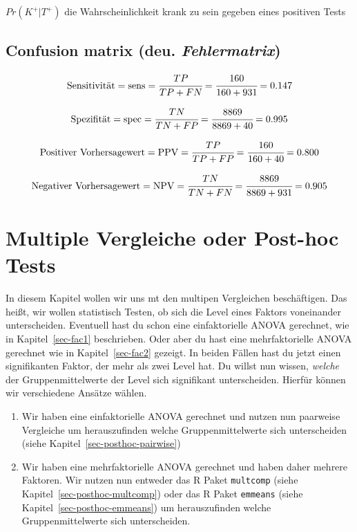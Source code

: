 \documentclass[
  letterpaper,
  DIV=11,
  oneside]{scrreport}
\providecommand{\tightlist}{%
  \setlength{\itemsep}{0pt}\setlength{\parskip}{0pt}}\usepackage{longtable,booktabs,array}
\begin{document}
\(Pr(K^+|T^+)\) die Wahrscheinlichkeit krank zu sein gegeben eines
positiven Tests

\hypertarget{confusion-matrix-deu.-fehlermatrix}{%
\section{\texorpdfstring{Confusion matrix (deu.
\emph{Fehlermatrix})}{Confusion matrix (deu. Fehlermatrix)}}\label{confusion-matrix-deu.-fehlermatrix}}


\[
\mbox{Sensitivität} = \mbox{sens} = \cfrac{TP}{TP + FN} = \cfrac{160}{160 + 931} = 0.147
\]

\[
\mbox{Spezifität} = \mbox{spec} = \cfrac{TN}{TN + FP} = \cfrac{8869}{8869 + 40} = 0.995
\]

\[
\mbox{Positiver Vorhersagewert} = \mbox{PPV} = \cfrac{TP}{TP + FP} = \cfrac{160}{160 + 40} = 0.800
\]

\[
\mbox{Negativer Vorhersagewert} = \mbox{NPV} = \cfrac{TN}{TN + FN} = \cfrac{8869}{8869 + 931} = 0.905
\]

\hypertarget{sec-posthoc}{%
\chapter{Multiple Vergleiche oder Post-hoc Tests}\label{sec-posthoc}}

In diesem Kapitel wollen wir uns mt den multipen Vergleichen
beschäftigen. Das heißt, wir wollen statistisch Testen, ob sich die
Level eines Faktors voneinander unterscheiden. Eventuell hast du schon
eine einfaktorielle ANOVA gerechnet, wie in Kapitel~\ref{sec-fac1}
beschrieben. Oder aber du hast eine mehrfaktorielle ANOVA gerechnet wie
in Kapitel~\ref{sec-fac2} gezeigt. In beiden Fällen hast du jetzt einen
signifikanten Faktor, der mehr als zwei Level hat. Du willst nun wissen,
\emph{welche} der Gruppenmittelwerte der Level sich signifikant
unterscheiden. Hierfür können wir verschiedene Ansätze wählen.

\begin{enumerate}
\def\labelenumi{\arabic{enumi})}
\tightlist
\item
  Wir haben eine einfaktorielle ANOVA gerechnet und nutzen nun paarweise
  Vergleiche um herauszufinden welche Gruppenmittelwerte sich
  unterscheiden (siehe Kapitel~\ref{sec-posthoc-pairwise})
\item
  Wir haben eine mehrfaktorielle ANOVA gerechnet und haben daher mehrere
  Faktoren. Wir nutzen nun entweder das R Paket \texttt{multcomp} (siehe
  Kapitel~\ref{sec-posthoc-multcomp}) oder das R Paket \texttt{emmeans}
  (siehe Kapitel~\ref{sec-posthoc-emmeans}) um herauszufinden welche
  Gruppenmittelwerte sich unterscheiden.
\end{enumerate}
\end{document}
